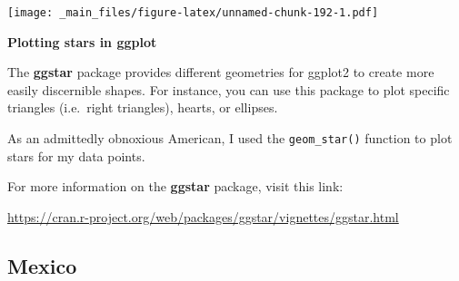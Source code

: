 \documentclass[
]{book}
\begin{document}
\texttt{[image: \_main\_files/figure-latex/unnamed-chunk-192-1.pdf]}

\begin{blackbox}

\begin{center}
\textbf{Plotting stars in ggplot}

\end{center}

The \textbf{ggstar} package provides different geometries for ggplot2 to create more easily discernible shapes. For instance, you can use this package to plot specific triangles (i.e.~right triangles), hearts, or ellipses.

As an admittedly obnoxious American, I used the \texttt{geom\_star()} function to plot stars for my data points.

For more information on the \textbf{ggstar} package, visit this link:

\url{https://cran.r-project.org/web/packages/ggstar/vignettes/ggstar.html}

\end{blackbox}

\hypertarget{mexico}{%
\subsection{Mexico}\label{mexico}}
\end{document}
